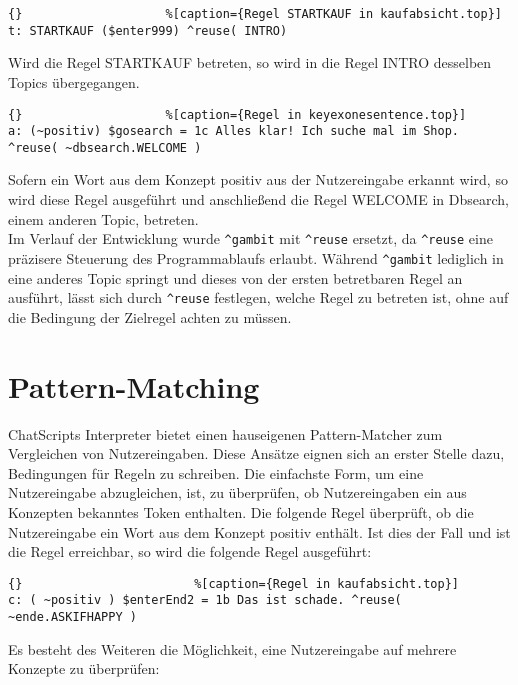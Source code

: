 \begin{lstlisting}{}					%[caption={Regel STARTKAUF in kaufabsicht.top}]
t: STARTKAUF ($enter999) ^reuse( INTRO)
\end{lstlisting}

Wird die Regel STARTKAUF betreten, so wird in die Regel INTRO desselben Topics übergegangen. 

\begin{lstlisting}{}					%[caption={Regel in keyexonesentence.top}]
a: (~positiv) $gosearch = 1c Alles klar! Ich suche mal im Shop. ^reuse( ~dbsearch.WELCOME )
\end{lstlisting}

Sofern ein Wort aus dem Konzept \texttildelow positiv aus der Nutzereingabe erkannt wird, so wird diese Regel ausgeführt und anschließend die Regel WELCOME in Dbsearch, einem anderen Topic, betreten.\\

Im Verlauf der Entwicklung wurde \lstinline|^gambit| mit \lstinline|^reuse| ersetzt, da \lstinline|^reuse| eine präzisere Steuerung des Programmablaufs erlaubt. Während \lstinline|^gambit| lediglich in eine anderes Topic springt und dieses von der ersten betretbaren Regel an ausführt, lässt sich durch \lstinline|^reuse| festlegen, welche Regel zu betreten ist, ohne auf die Bedingung der Zielregel achten zu müssen.\\


\section{Pattern-Matching}
\label{sec:ChatScript: Pattern-Matching}

ChatScripts Interpreter bietet einen hauseigenen Pattern-Matcher zum Vergleichen von Nutzereingaben. Diese Ansätze eignen sich an erster Stelle dazu, Bedingungen für Regeln zu schreiben. Die einfachste Form, um eine Nutzereingabe abzugleichen, ist, zu überprüfen, ob Nutzereingaben ein aus Konzepten bekanntes Token enthalten. Die folgende Regel überprüft, ob die Nutzereingabe ein Wort aus dem Konzept \texttildelow positiv enthält. Ist dies der Fall und ist die Regel erreichbar, so wird die folgende Regel ausgeführt:

\begin{lstlisting}{}						%[caption={Regel in kaufabsicht.top}]
c: ( ~positiv ) $enterEnd2 = 1b Das ist schade. ^reuse( ~ende.ASKIFHAPPY )
\end{lstlisting}

Es besteht des Weiteren die Möglichkeit, eine Nutzereingabe auf mehrere Konzepte zu überprüfen: 

